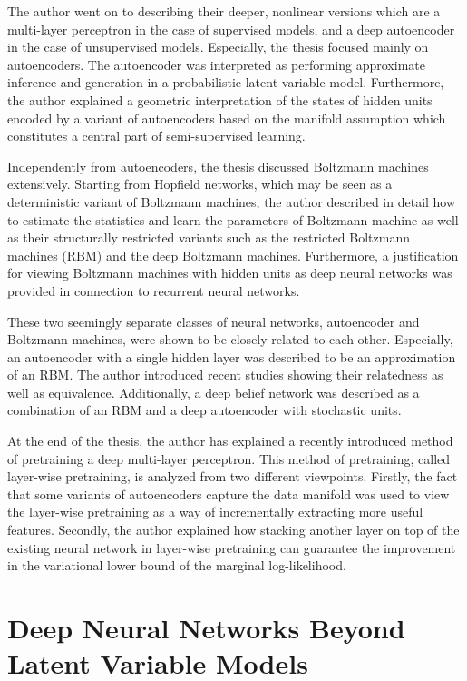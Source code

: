 \documentclass[dissertation,nocontribution,draft*]{aaltoseries}
\begin{document}
The author went on to describing their deeper, nonlinear
versions which are a multi-layer perceptron in the case of
supervised models, and a deep autoencoder in the case of
unsupervised models. Especially, the thesis focused mainly
on autoencoders. The autoencoder was interpreted as
performing approximate inference and generation in a
probabilistic latent variable model.  Furthermore, the
author explained a geometric interpretation of the states of
hidden units encoded by a variant of autoencoders based on
the manifold assumption which constitutes a central part of
semi-supervised learning.

Independently from autoencoders, the thesis discussed
Boltzmann machines extensively. Starting from Hopfield
networks, which may be seen as a deterministic variant of
Boltzmann machines, the author described in detail
how to estimate the statistics and learn the parameters of Boltzmann
machine as well as their structurally restricted variants
such as the restricted Boltzmann machines (RBM) and the deep
Boltzmann machines. Furthermore, a justification for viewing
Boltzmann machines with hidden units as deep neural networks
was provided in connection to recurrent neural networks.

These two seemingly separate classes of neural networks,
autoencoder and Boltzmann machines, were shown to be closely
related to each other. Especially, an autoencoder with a
single hidden layer was described to be an approximation of
an RBM. The author introduced recent studies showing their
relatedness as well as equivalence. Additionally, a deep
belief network was described as a combination of an RBM and
a deep autoencoder with stochastic units.

At the end of the thesis, the author has explained a recently
introduced method of pretraining a deep multi-layer
perceptron. This method of pretraining, called layer-wise
pretraining, is analyzed from two different viewpoints.
Firstly, the fact that some variants of autoencoders capture
the data manifold was used to view the layer-wise
pretraining as a way of incrementally extracting more useful
features. Secondly, the author explained how stacking
another layer on top of the existing neural network in 
layer-wise pretraining can guarantee the improvement in the
variational lower bound of the marginal log-likelihood.


\section{Deep Neural Networks Beyond Latent Variable Models}
\end{document}
